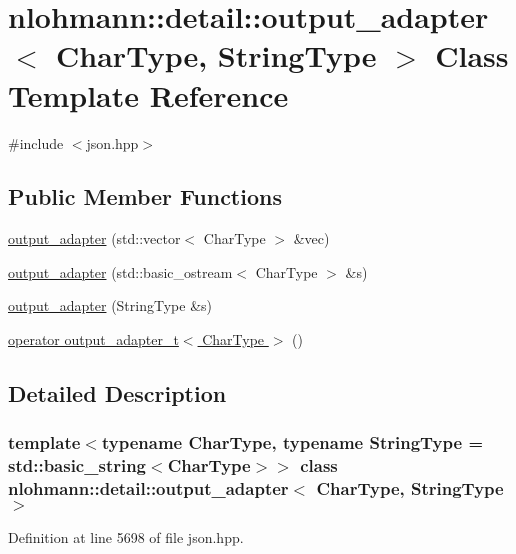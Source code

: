 \hypertarget{classnlohmann_1_1detail_1_1output__adapter}{}\section{nlohmann\+:\+:detail\+:\+:output\+\_\+adapter$<$ Char\+Type, String\+Type $>$ Class Template Reference}
\label{classnlohmann_1_1detail_1_1output__adapter}


{\ttfamily \#include $<$json.\+hpp$>$}

\subsection*{Public Member Functions}
\begin{DoxyCompactItemize}
\item 
\hyperlink{classnlohmann_1_1detail_1_1output__adapter_a05a30a77b568fd84676078d938cbd484}{output\+\_\+adapter} (std\+::vector$<$ Char\+Type $>$ \&vec)
\item 
\hyperlink{classnlohmann_1_1detail_1_1output__adapter_a43b3ba852e6a2c3f4d312543bb04c00d}{output\+\_\+adapter} (std\+::basic\+\_\+ostream$<$ Char\+Type $>$ \&s)
\item 
\hyperlink{classnlohmann_1_1detail_1_1output__adapter_a6ad59d1ec534383b430cd7ef8a518539}{output\+\_\+adapter} (String\+Type \&s)
\item 
\hyperlink{classnlohmann_1_1detail_1_1output__adapter_a5fdac7aec8ade2f4bb0b5df30550d90c}{operator output\+\_\+adapter\+\_\+t$<$ Char\+Type $>$} ()
\end{DoxyCompactItemize}


\subsection{Detailed Description}
\subsubsection*{template$<$typename Char\+Type, typename String\+Type = std\+::basic\+\_\+string$<$\+Char\+Type$>$$>$\newline
class nlohmann\+::detail\+::output\+\_\+adapter$<$ Char\+Type, String\+Type $>$}



Definition at line 5698 of file json.\+hpp.



